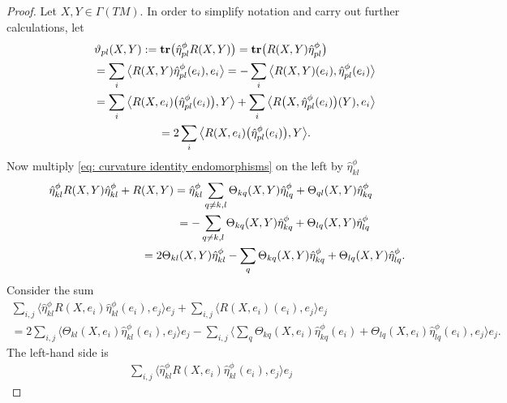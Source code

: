 \documentclass[10pt,a4paper]{amsart}
\newcommand{\tr}{\mbox{\bf tr}}
\numberwithin{equation}{section}
\begin{document}
\begin{proof}\allowdisplaybreaks Let $X,Y\in\Gamma(TM)$. In order to simplify notation and carry out further calculations, let
\begin{gather} \vartheta_{pl}(X,Y):= \tr\big(\hat{\eta}^\phi_{pl}{R(X,Y)}\big)=\tr\big({R(X,Y)}\hat{\eta}^\phi_{pl}\big)\nonumber\\
 \hphantom{\vartheta_{pl}(X,Y)}{} =
 \sum_i \big\langle {R(X,Y)}\hat{\eta}^\phi_{pl}(e_i),e_i\big\rangle =
 -\sum_i \big\langle {R(X,Y)}(e_i),\hat{\eta}^\phi_{pl}(e_i)\big\rangle \nonumber\\
\hphantom{\vartheta_{pl}(X,Y)}{} =
 \sum_i \big\langle {R(X,e_i)}\big(\hat{\eta}^\phi_{pl}(e_i)\big), Y\big\rangle +\sum_i \big\langle {R\big(X,\hat{\eta}^\phi_{pl}(e_i)\big) }(Y),e_i\big\rangle \nonumber\\
\hphantom{\vartheta_{pl}(X,Y)}{}
 =
 2\sum_i \big\langle {R(X,e_i)}\big(\hat{\eta}^\phi_{pl}(e_i)\big), Y\big\rangle .\label{eq: definition vartheta}
\end{gather}
Now multiply \eqref{eq: curvature identity endomorphisms}
on the left by $\hat\eta_{kl}^\phi$
\begin{gather}
\hat{\eta}^\phi_{kl}{R(X,Y)}\hat{\eta}^\phi_{kl}+{R(X,Y)} =
\hat{\eta}^\phi_{kl} \sum_{q\not= k,l} \Theta_{kq}(X,Y) \hat{\eta}^\phi_{lq}+ \Theta_{ql}(X,Y)\hat{\eta}^\phi_{kq}\nonumber\\
\hphantom{\hat{\eta}^\phi_{kl}{R(X,Y)}\hat{\eta}^\phi_{kl}+{R(X,Y)}}{} =
- \sum_{q\not= k,l} \Theta_{kq}(X,Y) \hat{\eta}^\phi_{kq}+ \Theta_{lq}(X,Y)\hat{\eta}^\phi_{lq}\nonumber\\
\hphantom{\hat{\eta}^\phi_{kl}{R(X,Y)}\hat{\eta}^\phi_{kl}+{R(X,Y)}}{} =
 2\Theta_{kl}(X,Y)\hat\eta_{kl}^\phi -\sum_{q} \Theta_{kq}(X,Y) \hat{\eta}^\phi_{kq}+ \Theta_{lq}(X,Y)\hat{\eta}^\phi_{lq}. \label{eq: curvature identity endomorphisms 2}
\end{gather}
Consider the sum
\begin{gather*}
\sum_{i,j}\big\langle \hat{\eta}^\phi_{kl}{R(X,e_i)}\hat{\eta}^\phi_{kl}(e_i),e_j\big\rangle e_j +\sum_{i,j}\langle {R(X,e_i)}(e_i),e_j\rangle e_j\\
{}= 2\sum_{i,j}\big\langle \Theta_{kl}(X,e_i)\hat\eta_{kl}^\phi(e_i),e_j\big\rangle e_j -\sum_{i,j}\bigg\langle \sum_{q} \Theta_{kq}(X,e_i) \hat{\eta}^\phi_{kq}(e_i)
 + \Theta_{lq}(X,e_i)\hat{\eta}^\phi_{lq}(e_i),e_j\bigg\rangle e_j.
\end{gather*}
The left-hand side is
\begin{gather*}
\sum_{i,j}\big\langle \hat{\eta}^\phi_{kl}{R(X,e_i)}\hat{\eta}^\phi_{kl}(e_i),e_j\big\rangle e_j

\end{gather*}
\end{proof}
\end{document}

